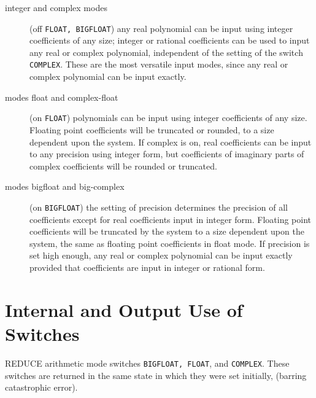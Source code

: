 \begin{description}
\item[integer and complex modes] (off {\tt FLOAT, BIGFLOAT}) any real
polynomial can be input using integer coefficients of any size; integer or
rational coefficients can be used to input any real or complex polynomial,
independent of the setting of the switch {\tt COMPLEX}.  These are the most
versatile input modes, since any real or complex polynomial can be input
exactly.

\item[modes float and complex-float] (on {\tt FLOAT}) polynomials can be input using
integer coefficients of any size.  Floating point coefficients will be
truncated or rounded, to a size dependent upon the system.  If complex
is on, real coefficients can be input to any precision using integer
form, but coefficients of imaginary parts of complex coefficients will
be rounded or truncated.

\item[modes bigfloat and big-complex] (on {\tt BIGFLOAT}) the setting of
precision determines the precision of all coefficients except for real
coefficients input in integer form.  Floating point coefficients will be
truncated by the system to a size dependent upon the system, the same as
floating point coefficients in float mode.  If precision is set high enough,
any real or complex polynomial can be input exactly provided that
coefficients are input in integer or rational form.
\end{description}

\section{Internal and Output Use of Switches}

REDUCE arithmetic mode switches {\tt BIGFLOAT, FLOAT}, and {\tt COMPLEX}.
These switches are returned in the same state in which they were set
initially, (barring catastrophic error).

